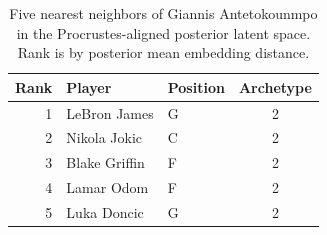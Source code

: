 \begin{table}[htbp]
  \centering\small
  \begin{tabular}{rllc}
    \toprule
    Rank & Player & Position & Archetype \\
    \midrule
    1 & LeBron James & G & 2 \\
    2 & Nikola Jokic & C & 2 \\
    3 & Blake Griffin & F & 2 \\
    4 & Lamar Odom & F & 2 \\
    5 & Luka Doncic & G & 2 \\
    \bottomrule
  \end{tabular}
  \caption{Five nearest neighbors of Giannis Antetokounmpo in the Procrustes-aligned posterior latent space. Rank is by posterior mean embedding distance.}
  \label{tab:Giannis_Antetokounmpo_neighbors}
\end{table}

